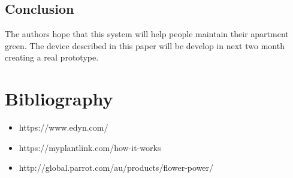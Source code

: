 \documentclass[conference]{IEEEtran}
\begin{document}


\begin{flushleft}
	
\section{Conclusion}
	The authors hope that this system will help people maintain their apartment green.
	The device described in this paper will be develop in  next two month creating a real prototype.
\end{flushleft}

\section{Bibliography}
\begin{itemize}
	\item https://www.edyn.com/
	\item https://myplantlink.com/how-it-works
	\item http://global.parrot.com/au/products/flower-power/
	
\end{itemize}



\end{document}
